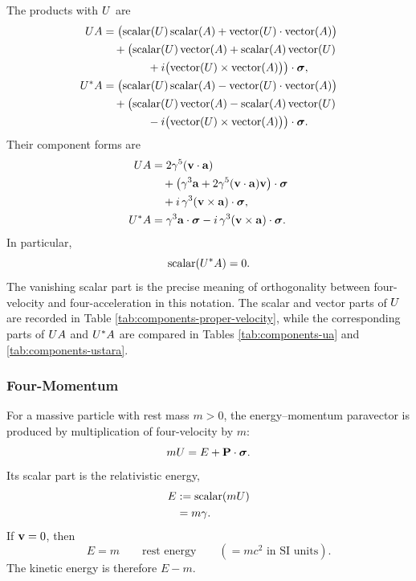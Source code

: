 The products with \(U\) are
\begin{align*}
UA
&=\bigl(
\operatorname{scalar}(U)\operatorname{scalar}(A)
+\operatorname{vector}(U)\cdot\operatorname{vector}(A)
\bigr)\notag\\
&\quad+\bigl(
\operatorname{scalar}(U)\operatorname{vector}(A)
+\operatorname{scalar}(A)\operatorname{vector}(U)\notag\\
&\qquad\qquad
+i\bigl(\operatorname{vector}(U)\times\operatorname{vector}(A)\bigr)
\bigr)\cdot\mathbf{\bm{\sigma}},\\
U^*A
&=\bigl(
\operatorname{scalar}(U)\operatorname{scalar}(A)
-\operatorname{vector}(U)\cdot\operatorname{vector}(A)
\bigr)\notag\\
&\quad+\bigl(
\operatorname{scalar}(U)\operatorname{vector}(A)
-\operatorname{scalar}(A)\operatorname{vector}(U)\notag\\
&\qquad\qquad
-i\bigl(\operatorname{vector}(U)\times\operatorname{vector}(A)\bigr)
\bigr)\cdot\mathbf{\bm{\sigma}}.
\end{align*}
Their component forms are
\begin{align*}
UA
&=2\gamma^5(\mathbf{v}\cdot\mathbf{a})\notag\\
&\quad+\bigl(\gamma^3\mathbf{a}+2\gamma^5(\mathbf{v}\cdot\mathbf{a})\mathbf{v}\bigr)\cdot\mathbf{\bm{\sigma}}\notag\\
&\quad+i\,\gamma^3(\mathbf{v}\times\mathbf{a})\cdot\mathbf{\bm{\sigma}},\\
U^*A
&=\gamma^3\mathbf{a}\cdot\mathbf{\bm{\sigma}}-i\,\gamma^3(\mathbf{v}\times\mathbf{a})\cdot\mathbf{\bm{\sigma}}.
\end{align*}
In particular,
\begin{equation*}
\operatorname{scalar}(U^*A)=0.
\end{equation*}
The vanishing scalar part is the precise meaning of orthogonality between
four-velocity and four-acceleration in this notation. The scalar and vector
parts of \(U\) are recorded in Table
\ref{tab:components-proper-velocity}, while the corresponding parts of
\(UA\) and \(U^{*}A\) are compared in Tables
\ref{tab:components-ua} and \ref{tab:components-ustara}.


\subsubsection{Four-Momentum}
For a massive particle with rest mass \(m>0\), the energy--momentum paravector is produced by multiplication of four-velocity by \(m\):
\begin{equation*}
mU=E+\mathbf{P}\cdot\mathbf{\bm{\sigma}}.
\end{equation*}
Its scalar part is the relativistic energy,
\begin{align*}
E
&:=\operatorname{scalar}(mU)\notag\\
&=m\gamma.
\end{align*}
If \(\mathbf{v}=0\), then
\begin{equation*}
E=m
\qquad \text{rest energy}
\qquad (=mc^{2}\text{ in SI units}).
\end{equation*}
The kinetic energy is therefore \(E-m\).

